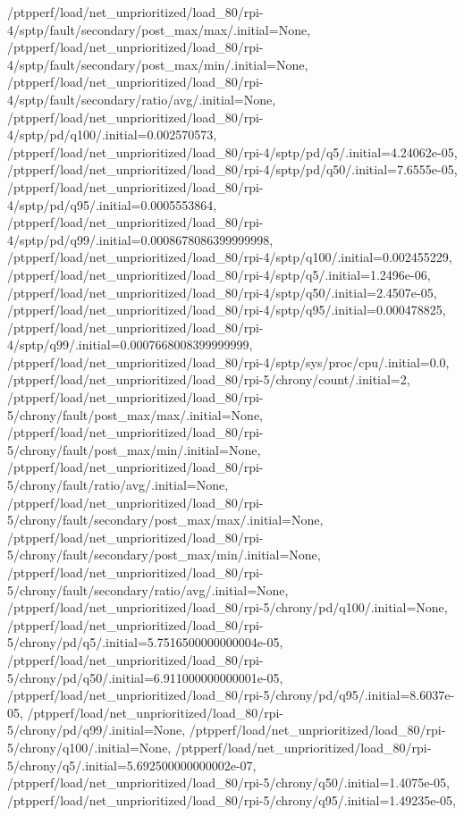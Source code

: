 {    /ptpperf/load/net_unprioritized/load_80/rpi-4/sptp/fault/secondary/post_max/max/.initial=None,
    /ptpperf/load/net_unprioritized/load_80/rpi-4/sptp/fault/secondary/post_max/min/.initial=None,
    /ptpperf/load/net_unprioritized/load_80/rpi-4/sptp/fault/secondary/ratio/avg/.initial=None,
    /ptpperf/load/net_unprioritized/load_80/rpi-4/sptp/pd/q100/.initial=0.002570573,
    /ptpperf/load/net_unprioritized/load_80/rpi-4/sptp/pd/q5/.initial=4.24062e-05,
    /ptpperf/load/net_unprioritized/load_80/rpi-4/sptp/pd/q50/.initial=7.6555e-05,
    /ptpperf/load/net_unprioritized/load_80/rpi-4/sptp/pd/q95/.initial=0.0005553864,
    /ptpperf/load/net_unprioritized/load_80/rpi-4/sptp/pd/q99/.initial=0.0008678086399999998,
    /ptpperf/load/net_unprioritized/load_80/rpi-4/sptp/q100/.initial=0.002455229,
    /ptpperf/load/net_unprioritized/load_80/rpi-4/sptp/q5/.initial=1.2496e-06,
    /ptpperf/load/net_unprioritized/load_80/rpi-4/sptp/q50/.initial=2.4507e-05,
    /ptpperf/load/net_unprioritized/load_80/rpi-4/sptp/q95/.initial=0.000478825,
    /ptpperf/load/net_unprioritized/load_80/rpi-4/sptp/q99/.initial=0.0007668008399999999,
    /ptpperf/load/net_unprioritized/load_80/rpi-4/sptp/sys/proc/cpu/.initial=0.0,
    /ptpperf/load/net_unprioritized/load_80/rpi-5/chrony/count/.initial=2,
    /ptpperf/load/net_unprioritized/load_80/rpi-5/chrony/fault/post_max/max/.initial=None,
    /ptpperf/load/net_unprioritized/load_80/rpi-5/chrony/fault/post_max/min/.initial=None,
    /ptpperf/load/net_unprioritized/load_80/rpi-5/chrony/fault/ratio/avg/.initial=None,
    /ptpperf/load/net_unprioritized/load_80/rpi-5/chrony/fault/secondary/post_max/max/.initial=None,
    /ptpperf/load/net_unprioritized/load_80/rpi-5/chrony/fault/secondary/post_max/min/.initial=None,
    /ptpperf/load/net_unprioritized/load_80/rpi-5/chrony/fault/secondary/ratio/avg/.initial=None,
    /ptpperf/load/net_unprioritized/load_80/rpi-5/chrony/pd/q100/.initial=None,
    /ptpperf/load/net_unprioritized/load_80/rpi-5/chrony/pd/q5/.initial=5.7516500000000004e-05,
    /ptpperf/load/net_unprioritized/load_80/rpi-5/chrony/pd/q50/.initial=6.911000000000001e-05,
    /ptpperf/load/net_unprioritized/load_80/rpi-5/chrony/pd/q95/.initial=8.6037e-05,
    /ptpperf/load/net_unprioritized/load_80/rpi-5/chrony/pd/q99/.initial=None,
    /ptpperf/load/net_unprioritized/load_80/rpi-5/chrony/q100/.initial=None,
    /ptpperf/load/net_unprioritized/load_80/rpi-5/chrony/q5/.initial=5.692500000000002e-07,
    /ptpperf/load/net_unprioritized/load_80/rpi-5/chrony/q50/.initial=1.4075e-05,
    /ptpperf/load/net_unprioritized/load_80/rpi-5/chrony/q95/.initial=1.49235e-05,
}
